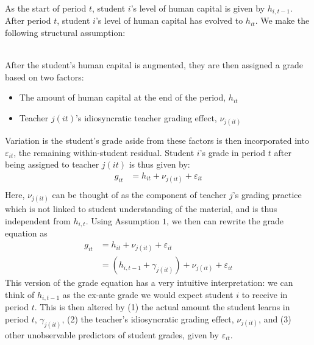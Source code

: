 \documentclass{article}\usepackage{knitr}
\begin{document}
As the start of period $t$, student $i$'s level of human capital is given by $h_{i,t-1}$. After period $t$, student $i$'s level of human capital has evolved to $h_{it}$. We make the following structural assumption:

\bigskip 
\noindent{}\\


\noindent After the student's human capital is augmented, they are then assigned a grade based on two factors:
\begin{itemize}
	\item The amount of human capital at the end of the period, $h_{it}$
	\item Teacher $j(it)$'s idiosyncratic teacher grading effect, $\nu_{j(it)}$
\end{itemize}
Variation is the student's grade aside from these factors is then incorporated into $\varepsilon_{it}$, the remaining within-student residual. Student $i$'s grade in period $t$ after being assigned to teacher $j(it)$ is thus given by:
\begin{equation}
\begin{split}
 	g_{it} & = h_{it}+\nu_{j(it)}+\varepsilon_{it}\\
\end{split}
\end{equation}
Here, $\nu_{j(it)}$ can be thought of as the component of teacher $j$'s grading practice which is not linked to student understanding of the material, and is thus independent from $h_{i,t}$. Using Assumption $1$, we then can rewrite the grade equation as 
\begin{equation}
\begin{split}
	\label{eqn:grade_eqn}
 	g_{it} & = h_{it}+\nu_{j(it)}+\varepsilon_{it}\\\
 	& = (h_{i,t-1} + \gamma_{j(it)}) + \nu_{j(it)} + \varepsilon_{it}
\end{split}
\end{equation}
This version of the grade equation has a very intuitive interpretation: we can think of $h_{i,t-1}$ as the ex-ante grade we would expect student $i$ to receive in period $t$. This is then altered by (1) the actual amount the student learns in period $t$, $\gamma_{j(it)}$, (2) the teacher's idiosyncratic grading effect, $\nu_{j(it)}$, and (3) other unobservable predictors of student grades, given by $\varepsilon_{it}$. 
\end{document}

